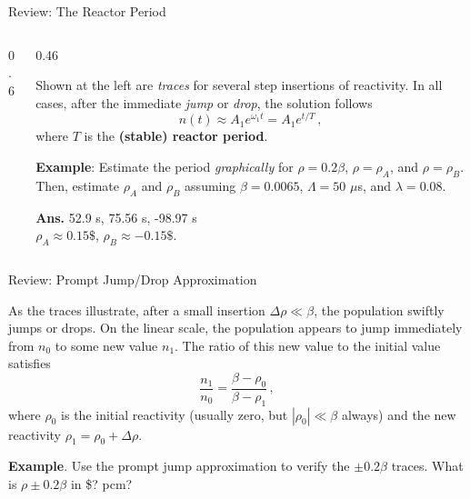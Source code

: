 \documentclass[aspectratio=1610]{beamer}
\begin{document}
\begin{frame}[fragile]{Review: The Reactor Period}
 
\begin{columns}[T]

\begin{column}{0.6\textwidth}

\resizebox{0.99\textwidth}{!}{}

\end{column}

\begin{column}{0.46\textwidth}

Shown at the left are {\it traces} for several step insertions of reactivity.  
In all cases, after the immediate {\it jump} or {\it drop}, the solution follows
\begin{equation*}
   n(t) \approx A_1 e^{\omega_1 t} = A_1 e^{t/T} \, ,
\end{equation*}
where $T$ is the {\bf (stable) reactor period}.
 
\vspace{0.25cm}

{\bf Example}: Estimate the period {\it graphically} for $\rho = 0.2\beta$, $\rho = \rho_A$, and $\rho = \rho_B$.
Then, estimate $\rho_A$ and $\rho_B$ assuming $\beta =  0.0065$, $\Lambda = 50$ $\mu$s, and $\lambda= 0.08$.

\pause 

\textcolor{wcprimary}{
{\bf Ans.}  52.9 s, 75.56 s, -98.97 s \\
$\rho_A \approx 0.15\$$, $\rho_B \approx -0.15\$$.
}

\end{column}

\end{columns}

\end{frame}


\begin{frame}[fragile]{Review: Prompt Jump/Drop Approximation}

As the traces illustrate, after a small insertion $\Delta \rho \ll \beta$, the population swiftly jumps or drops.  On the linear scale, the population appears to jump immediately from $n_0$ to some new value $n_1$.  The ratio of this new value to the initial value satisfies 
\begin{equation*}
\boxed{\frac{n_1}{n_0} = \frac{\beta - \rho_0}{\beta - \rho_1}} \, ,
  \tag{Prompt Jump Approximation}
\end{equation*}
where $\rho_0$ is the initial reactivity (usually zero, but $|\rho_0| \ll \beta$ always) and the new reactivity $\rho_1 = \rho_0 + \Delta \rho$.

\vfill 

{\bf Example}. Use the prompt jump approximation to verify
the $\pm 0.2\beta$ traces.  What is $\rho \pm 0.2\beta$ in \$? pcm?

\end{frame}
\end{document}
